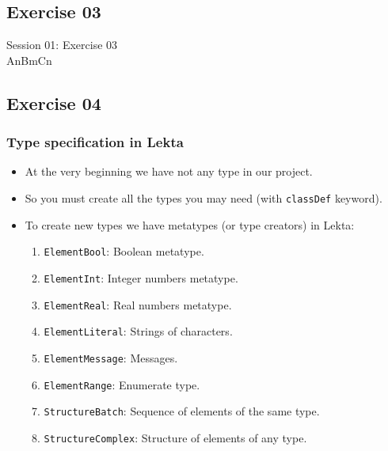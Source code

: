 \documentclass[11pt]{beamer}
\begin{document}
\subsection{Exercise 03}

\begin{frame}[fragile]
\Huge
\begin{center}
Session 01: Exercise 03\\
AnBmCn
\end{center}
\end{frame}

\subsection{Exercise 04}

\begin{frame}[fragile]
\frametitle{Type specification in Lekta}
\begin{itemize}
	\item At the very beginning we have not any type in our project.
	\pause
	\item So you must create all the types you may need (with \texttt{classDef} keyword).
	\pause
	\item To create new types we have metatypes (or type creators) in Lekta:
	\begin{enumerate}
		\item \texttt{ElementBool}: Boolean metatype.
		\item \texttt{ElementInt}: Integer numbers metatype.
		\item \texttt{ElementReal}: Real numbers metatype.
		\item \texttt{ElementLiteral}: Strings of characters.
		\item \texttt{ElementMessage}: Messages.
		\item \texttt{ElementRange}: Enumerate type.
		\item \texttt{StructureBatch}: Sequence of elements of the same type.
		\item \texttt{StructureComplex}: Structure of elements of any type.
	\end{enumerate}
\end{itemize}
\end{frame}
\end{document}
